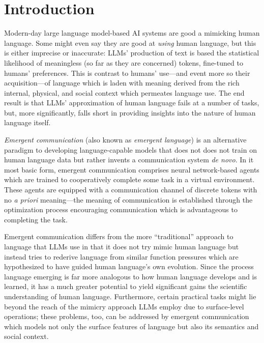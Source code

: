 


\chapter{Introduction}

Modern-day large language model-based AI systems are good a mimicking human language.
Some might even say they are good at \emph{using} human language, but this is either imprecise or inaccurate:
  LLMs' production of text is based the statistical likelihood of meaningless (so far as they are concerned) tokens, fine-tuned to humans' preferences.
This is contrast to humans' use---and event more so their acquisition---of language which is laden with meaning derived from the rich internal, physical, and social context which permeates language use.
The end result is that LLMs' approximation of human language fails at a number of tasks, but, more significantly, falls short in providing insights into the nature of human language itself.

\emph{Emergent communication} (also known as \emph{emergent language}) is an alternative paradigm to developing language-capable models that does not does not train on human language data but rather invents a communication system \emph{de novo}.
In it most basic form, emergent communication comprises neural network-based agents which are trained to cooperatively complete some task in a virtual environment.
These agents are equipped with a communication channel of discrete tokens with no \emph{a priori} meaning---the meaning of communication is established through the optimization process encouraging communication which is advantageous to completing the task.

Emergent communication differs from the more ``traditional'' approach to language that LLMs use in that it does not try mimic human language but instead tries to rederive language from similar function pressures which are hypothesized to have guided human language's own evolution.
Since the process language emerging is far more analogous to how human language develops and is learned, it has a much greater potential to yield significant gains the scientific understanding of human language.
Furthermore, certain practical tasks might lie beyond the reach of the mimicry approach LLMs employ due to surface-level operations; these problems, too, can be addressed by emergent communication which models not only the surface features of language but also its semantics and social context.

